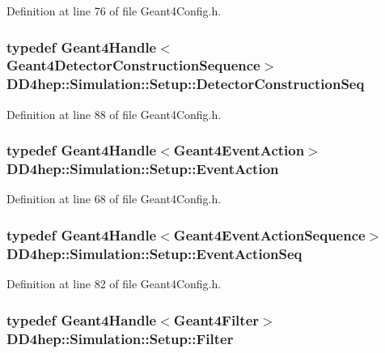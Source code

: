 Definition at line 76 of file Geant4Config.h.\hypertarget{namespace_d_d4hep_1_1_simulation_1_1_setup_a66188950ce6f5c228993102224d2552a}{
\subsubsection[{DetectorConstructionSeq}]{\setlength{\rightskip}{0pt plus 5cm}typedef {\bf Geant4Handle}$<${\bf Geant4DetectorConstructionSequence}$>$ {\bf DD4hep::Simulation::Setup::DetectorConstructionSeq}}}
\label{namespace_d_d4hep_1_1_simulation_1_1_setup_a66188950ce6f5c228993102224d2552a}


Definition at line 88 of file Geant4Config.h.\hypertarget{namespace_d_d4hep_1_1_simulation_1_1_setup_ad2f4a62fb2f0e3977ad95f8414ed8d26}{
\subsubsection[{EventAction}]{\setlength{\rightskip}{0pt plus 5cm}typedef {\bf Geant4Handle}$<${\bf Geant4EventAction}$>$ {\bf DD4hep::Simulation::Setup::EventAction}}}
\label{namespace_d_d4hep_1_1_simulation_1_1_setup_ad2f4a62fb2f0e3977ad95f8414ed8d26}


Definition at line 68 of file Geant4Config.h.\hypertarget{namespace_d_d4hep_1_1_simulation_1_1_setup_a4be5336a4ddd9dee751fc71c1f391c38}{
\subsubsection[{EventActionSeq}]{\setlength{\rightskip}{0pt plus 5cm}typedef {\bf Geant4Handle}$<${\bf Geant4EventActionSequence}$>$ {\bf DD4hep::Simulation::Setup::EventActionSeq}}}
\label{namespace_d_d4hep_1_1_simulation_1_1_setup_a4be5336a4ddd9dee751fc71c1f391c38}


Definition at line 82 of file Geant4Config.h.\hypertarget{namespace_d_d4hep_1_1_simulation_1_1_setup_ad8d99728c073de63615427fbb8a1992a}{
\subsubsection[{Filter}]{\setlength{\rightskip}{0pt plus 5cm}typedef {\bf Geant4Handle}$<${\bf Geant4Filter}$>$ {\bf DD4hep::Simulation::Setup::Filter}}}
\label{namespace_d_d4hep_1_1_simulation_1_1_setup_ad8d99728c073de63615427fbb8a1992a}


